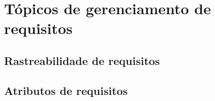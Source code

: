\chapter{Tópicos de gerenciamento de requisitos}

\section{Rastreabilidade de requisitos}


\section{Atributos de requisitos}

